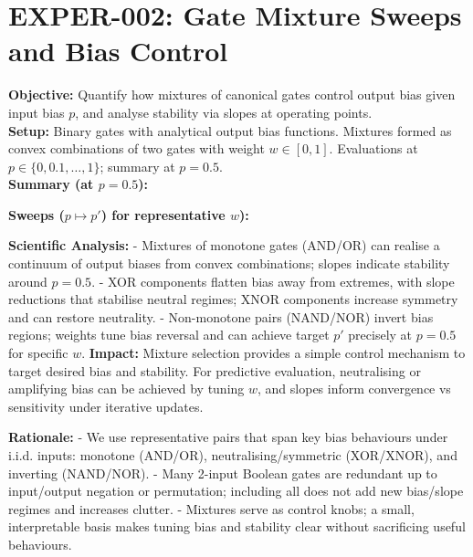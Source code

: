 \documentclass[11pt]{article}
\begin{document}
\section{EXPER-002: Gate Mixture Sweeps and Bias Control}
\textbf{Objective:} Quantify how mixtures of canonical gates control output bias given input bias $p$, and analyse stability via slopes at operating points.\\
\textbf{Setup:} Binary gates with analytical output bias functions. Mixtures formed as convex combinations of two gates with weight $w\in[0,1]$. Evaluations at $p\in\{0,0.1,\dots,1\}$; summary at $p=0.5$.\\
\textbf{Summary (at $p=0.5$):}\\
\begin{center}
\end{center}
\textbf{Sweeps ($p\mapsto p'$) for representative $w$):}\\
\begin{center}
\end{center}
\begin{center}
\end{center}
\begin{center}
\end{center}
\textbf{Scientific Analysis:}
- Mixtures of monotone gates (AND/OR) can realise a continuum of output biases from convex combinations; slopes indicate stability around $p=0.5$.
- XOR components flatten bias away from extremes, with slope reductions that stabilise neutral regimes; XNOR components increase symmetry and can restore neutrality.
- Non-monotone pairs (NAND/NOR) invert bias regions; weights tune bias reversal and can achieve target $p'$ precisely at $p=0.5$ for specific $w$.
\textbf{Impact:} Mixture selection provides a simple control mechanism to target desired bias and stability. For predictive evaluation, neutralising or amplifying bias can be achieved by tuning $w$, and slopes inform convergence vs sensitivity under iterative updates.

\textbf{Rationale:}
- We use representative pairs that span key bias behaviours under i.i.d. inputs: monotone (AND/OR), neutralising/symmetric (XOR/XNOR), and inverting (NAND/NOR).
- Many 2-input Boolean gates are redundant up to input/output negation or permutation; including all does not add new bias/slope regimes and increases clutter.
- Mixtures serve as control knobs; a small, interpretable basis makes tuning bias and stability clear without sacrificing useful behaviours.
\end{document}
